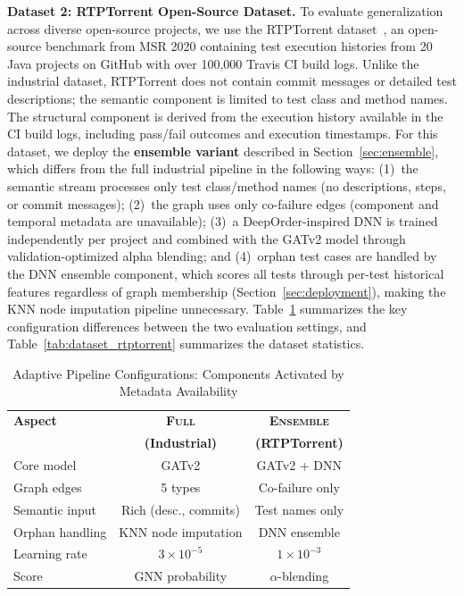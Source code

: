 \documentclass[10pt,journal,compsoc]{IEEEtran}
\begin{document}
\textbf{Dataset 2: RTPTorrent Open-Source Dataset.} To evaluate generalization
across diverse open-source projects, we use the RTPTorrent
dataset~\cite{mattis2020rtptorrent}, an open-source benchmark from MSR 2020
containing test execution histories from 20 Java projects on GitHub with over
100,000 Travis CI build logs. Unlike the industrial dataset, RTPTorrent does not
contain commit messages or detailed test descriptions; the semantic component is
limited to test class and method names. The structural component is derived from
the execution history available in the CI build logs, including pass/fail
outcomes and execution timestamps. For this dataset, we deploy the
\textbf{ensemble variant} described in Section~\ref{sec:ensemble}, which
differs from the full industrial pipeline in the following ways:
(1)~the semantic stream processes only test class/method names (no
descriptions, steps, or commit messages); (2)~the graph uses only
co-failure edges (component and temporal metadata are unavailable);
(3)~a DeepOrder-inspired DNN is trained independently per project and
combined with the GATv2 model through validation-optimized alpha blending;
and (4)~orphan test cases are handled by the DNN ensemble component, which
scores all tests through per-test historical features regardless of graph
membership (Section~\ref{sec:deployment}), making the KNN node imputation
pipeline unnecessary.
Table~\ref{tab:rtptorrent_config} summarizes the key configuration
differences between the two evaluation settings, and
Table~\ref{tab:dataset_rtptorrent} summarizes the dataset statistics.

\begin{table}[!t]
\centering
\caption{Adaptive Pipeline Configurations: Components Activated by Metadata Availability}
\label{tab:rtptorrent_config}
\footnotesize
\begin{tabular}{lcc}
\toprule
\textbf{Aspect} & \textbf{\textsc{Full}} & \textbf{\textsc{Ensemble}} \\
 & \textbf{(Industrial)} & \textbf{(RTPTorrent)} \\
\midrule
Core model & GATv2 & GATv2 + DNN \\
Graph edges & 5 types & Co-failure only \\
Semantic input & Rich (desc., commits) & Test names only \\
Orphan handling & KNN node imputation & DNN ensemble \\
Learning rate & $3{\times}10^{-5}$ & $1{\times}10^{-3}$ \\
Score & GNN probability & $\alpha$-blending \\
\bottomrule
\end{tabular}
\end{table}
\end{document}
